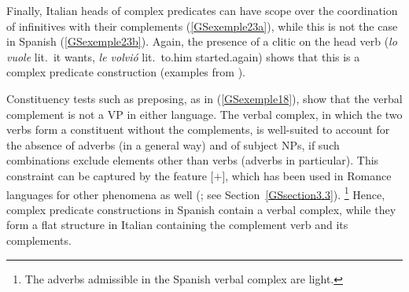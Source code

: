 {	\label{GSexemple22b}		
	
	\label{GSexemple22c}	
\zl

Finally, Italian heads of complex predicates can have scope over the coordination of infinitives with their complements (\ref{GSexemple23a}), while this is not the case in Spanish (\ref{GSexemple23b}). Again, the presence of a clitic on the head verb (\emph{lo vuole} lit.\ it wants, \emph{le volvi\'o} lit.\ to.him started.again) shows that this is a complex predicate construction (examples from \citealt[136--137]{AG2010}).

\eal
\judgewidth{\%}
	\label{GSexemple23} 
	\label{GSexemple23a}

	\label{GSexemple23b}	
\zl

Constituency tests such as preposing, as in (\ref{GSexemple18}), show that the verbal complement is not a VP in either language. The verbal complex, in which the two verbs form a constituent without the complements, is well-suited to account for the absence of adverbs (in a general way) and of subject NPs, if such combinations exclude elements other than verbs (adverbs in particular). This constraint can be captured by the feature [\light $+$], which has been used in Romance languages for other phenomena as well (\citealt{abeille2000french}; see Section~\ref{GSsection3.3}).%
    \footnote{The adverbs admissible in the Spanish verbal complex are light.}
Hence, complex predicate constructions in Spanish contain a verbal complex, while they form a flat structure in Italian containing the complement verb and its complements. 

}
